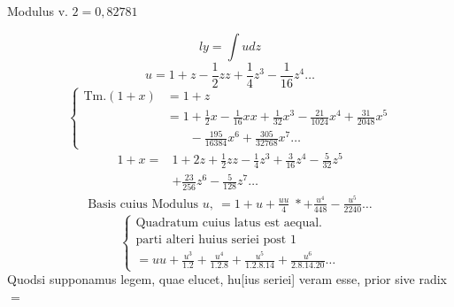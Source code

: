 \begingroup
\setlength{\headheight}{25pt}
\makeatletter\tagsleft@true\let\veqno\@@leqno\makeatother
{}\NoSourceHead
{}
\begin{center}Modulus v. \(2=0{,}82781\)\end{center}
\[ly=\int u dz\]
\[u=1+z-\frac12zz+\frac14z^3-\frac1{16}z^4\ldots\]
{\small\begin{equation}\tag*{[1]}
\left\{\begin{aligned}
\mathrm{Tm.}(1+x)&=1+z\\
&=1+\frac12x-\frac1{16}xx+\frac1{32}x^3-\frac{21}{1024}x^4+\frac{31}{2048}x^5\\
&\phantom{=1}{}-\frac{195}{16384}x^6+\frac{305}{32768}x^7\ldots
\end{aligned}\right.
\end{equation}}
\begin{equation}\tag*{[2]}\begin{aligned}
1+x={}&1+2z+\frac12zz-\frac14z^3+\frac3{16}z^4-\frac5{32}z^5\\
&+\frac{23}{256}z^6-\frac5{128}z^7\ldots
\end{aligned}\end{equation}
\begin{equation}\tag*{[3]}\begin{gathered}
\text{Basis cuius Modulus }u,\ =1+u+\frac{uu}{4}\;\ast+\frac{u^4}{448}-\frac{u^5}{2240}\ldots
\end{gathered}\end{equation}
\begin{equation}\tag*{[4]}
\left\{\begin{gathered}
\text{Quadratum cuius latus est aequal.}\\
\text{parti alteri huius seriei post 1}\\
=uu+\frac{u^3}{1.2}+\frac{u^4}{1.2.8}+\frac{u^5}{1.2.8.14}+\frac{u^6}{2.8.14.20}\ldots
\end{gathered}\right.
\end{equation}
\clearpage
{}\fancyhead{}
\noindent Quodsi supponamus legem, quae elucet, hu[ius seriei] veram esse, prior sive radix \(=\)
